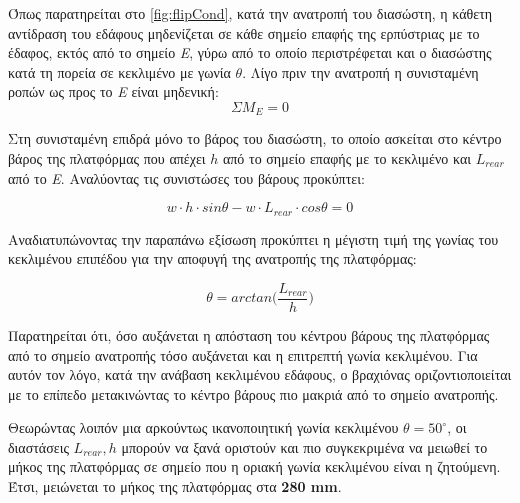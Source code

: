 Όπως παρατηρείται στο \ref{fig:flipCond}, κατά την ανατροπή του διασώστη, η κάθετη αντίδραση του εδάφους μηδενίζεται σε κάθε σημείο επαφής της ερπύστριας με το έδαφος, εκτός από το σημείο \textit{E}, γύρω από το οποίο περιστρέφεται και ο διασώστης κατά τη πορεία σε κεκλιμένο με γωνία $\theta$. Λίγο πριν την ανατροπή η συνισταμένη ροπών ως προς το \textit{E} είναι μηδενική:
\begin{equation}
    \Sigma M_{E} = 0
\end{equation}

Στη συνισταμένη επιδρά μόνο το βάρος του διασώστη, το οποίο ασκείται στο κέντρο βάρος της πλατφόρμας που απέχει $h$ από το σημείο επαφής με το κεκλιμένο και $L_{rear}$ από το \textit{E}. Αναλύοντας τις συνιστώσες του βάρους προκύπτει:

\begin{equation}
    w\cdot h \cdot sin\theta - w \cdot L_{rear} \cdot cos\theta = 0
\end{equation}

Αναδιατυπώνοντας την παραπάνω εξίσωση προκύπτει η μέγιστη τιμή της γωνίας του κεκλιμένου επιπέδου για την αποφυγή της ανατροπής της πλατφόρμας:

\begin{equation}
    \theta = arctan\bigg(\frac{L_{rear}}{h}\bigg)
\end{equation}

Παρατηρείται ότι, όσο αυξάνεται η απόσταση του κέντρου βάρους της πλατφόρμας από το σημείο ανατροπής τόσο αυξάνεται και η επιτρεπτή γωνία κεκλιμένου. Για αυτόν τον λόγο, κατά την ανάβαση κεκλιμένου εδάφους, ο βραχιόνας οριζοντιοποιείται με το επίπεδο μετακινώντας το κέντρο βάρους πιο μακριά από το σημείο ανατροπής. 
\par Θεωρώντας λοιπόν μια αρκούντως ικανοποιητική γωνία κεκλιμένου $\theta = 50^\circ$, οι διαστάσεις $L_{rear}, h$ μπορούν να ξανά οριστούν και πιο συγκεκριμένα να μειωθεί το μήκος της πλατφόρμας σε σημείο που η οριακή γωνία κεκλιμένου είναι η ζητούμενη. Έτσι, μειώνεται το μήκος της πλατφόρμας στα \textbf{280 mm}.








